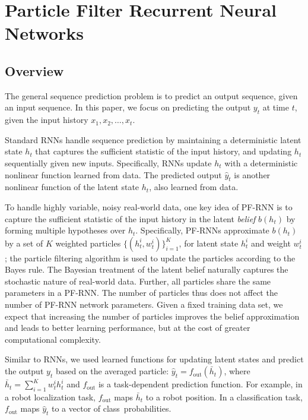 \documentclass[letterpaper]{article} %
\begin{document}
\section{Particle Filter Recurrent Neural Networks}

\subsection{Overview}
The general sequence prediction problem is to predict an output sequence, given an input sequence. 
In this paper,  we focus on predicting the output $y_t$ at   time $t$, given the input history $x_1,x_2,\ldots,x_t$. 

Standard RNNs handle sequence prediction by maintaining a deterministic latent state $h_t$ that captures the sufficient statistic of the input history, and updating $h_t$ sequentially given new inputs. Specifically, RNNs update $h_t$ with a  deterministic nonlinear function learned from data.
The predicted output $\hat{y}_t$  is another nonlinear function of the latent state $h_t$, also learned from data.

To handle highly variable, noisy real-world data, one key idea of PF-RNN is to capture the sufficient statistic of the input history in the latent \textit{belief}  $b(h_t)$ by forming multiple hypotheses over $h_t$. 
Specifically, PF-RNNs approximate $b(h_t)$ by a set of $K$ weighted particles $\{ (h_t^i,w_t^i) \}_{i=1}^K$, for latent state $h_t^i$ and weight $w_t^i$;  the particle filtering algorithm is used to  update the particles according to the Bayes rule.
The Bayesian treatment of the latent belief naturally captures the stochastic nature of real-world data.
Further, all particles share the same parameters in a PF-RNN.   The number of particles thus does not affect the number of PF-RNN network parameters. 
Given a fixed training data set, we expect that increasing the number of particles improves the belief approximation and leads to better learning performance,  but at the cost of greater computational complexity. 

Similar to RNNs, we used learned functions for updating latent states and predict the output $y_t$ based on the averaged particle: $\hat{y}_t = f_\mathrm{out}(\bar{h}_t)$,
where $\bar{h}_t = \sum_{i=1}^K w_t^i h_t^i$ and $f_\mathrm{out}$ is a  task-dependent prediction function.
For example, in a robot localization task, $f_\mathrm{out}$ maps $\bar{h}_t$ to a robot position. In a classification task, $f_\mathrm{out}$ maps $\hat{y}_t$ to a vector of class~probabilities.
\end{document}
